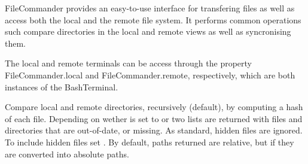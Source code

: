 \documentclass[letterpaper,10pt,english]{sphinxmanual}
\begin{document}
\begin{fulllineitems}
\label{api/shell_terminals:batchq.pipelines.shell.utils.FileCommander}
FileCommander provides an easy-to-use interface for transfering 
files as well as access both the local and the remote file system. It 
performs common operations such compare directories in the local and
remote views as well as syncronising them.

The local and remote terminals can be access through the property
FileCommander.local and FileCommander.remote, respectively, which
are both instances of the BashTerminal.

\begin{fulllineitems}
\label{api/shell_terminals:batchq.pipelines.shell.utils.FileCommander.MODE_LOCAL_REMOTE}
\end{fulllineitems}


\begin{fulllineitems}
\label{api/shell_terminals:batchq.pipelines.shell.utils.FileCommander.MODE_REMOTE_LOCAL}
\end{fulllineitems}


\begin{fulllineitems}
\label{api/shell_terminals:batchq.pipelines.shell.utils.FileCommander.diff}
Compare local and remote directories, recursively  (default),  by computing a hash of each file.  
Depending on wether  is set to
 or   
two lists are returned with files and directories that are
out-of-date, or missing. As standard, hidden files are
ignored. To include hidden files  set . By default, paths returned are relative, but if
 they are converted into absolute paths.


\end{fulllineitems}
\end{fulllineitems}
\end{document}
